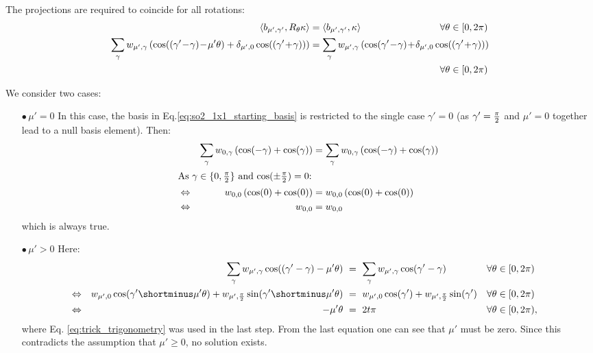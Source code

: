 \documentclass{article}
\newcommand{\lp}{\left(}
\newcommand{\rp}{\right)}
\begin{document}
The projections are required to coincide for all rotations:
\begin{align*}
	\langle b_{\mu',\gamma'},  R_{\theta} \kappa \rangle &= \langle b_{\mu',\gamma'},  \kappa \rangle  & \forall\theta\in[0,2\pi)\phantom{,}\!\\
\sum_{\gamma} w_{\mu', \gamma} \lp\cos((\gamma'\!-\!\gamma) \!-\! \mu'\theta) + \delta_{\mu', 0}\cos((\gamma'\!+\!\gamma)) \rp &=
	\sum_{\gamma} w_{\mu', \gamma} \lp\cos(\gamma'\!-\!\gamma) \!+\! \delta_{\mu', 0}\cos((\gamma'\!+\!\gamma)) \rp \span \\
	&&\forall\theta\in[0,2\pi)\phantom{,}\!
\end{align*}

We consider two cases:
\begin{itemize}
\item[$\bullet\,\mu'\!=\!0$]
In this case, the basis in Eq.\eqref{eq:so2_1x1_starting_basis} is restricted to the single case $\gamma' = 0$ (as $\gamma' = {\pi\over2}$ and $\mu' = 0$ together lead to a null basis element).
Then:
\begin{align*}
	&&\sum_{\gamma} w_{0, \gamma} \lp\cos(-\gamma) + \cos(\gamma) \rp &= \sum_{\gamma} w_{0, \gamma} \lp\cos(-\gamma) + \cos(\gamma) \rp \\
\intertext{As $\gamma \in \{0, {\pi\over 2}\}$ and $\cos(\pm {\pi\over 2}) = 0$:}
	&\Leftrightarrow &w_{0, 0} \lp\cos(0) + \cos(0) \rp &= w_{0, 0} \lp\cos(0) + \cos(0) \rp \\
	&\Leftrightarrow &w_{0,0} &= w_{0,0}
\end{align*}
which is always true.

\item[$\bullet\,\mu'\!>\!0$] Here:
\begin{align*}
	&&\sum_{\gamma} w_{\mu', \gamma} \cos((\gamma'-\gamma) - \mu'\theta)\ &=\ \sum_{\gamma} w_{\mu', \gamma} \cos(\gamma'-\gamma) &\forall\theta\in[0,2\pi) \\
	&\Leftrightarrow &w_{\mu', 0} \cos(\gamma' \shortminus \mu'\theta) + w_{\mu', {\pi\over2}} \sin(\gamma' \shortminus \mu'\theta)\ &=\ w_{\mu', 0} \cos(\gamma') + w_{\mu', {\pi\over2}} \sin(\gamma') &\forall\theta\in[0,2\pi) \\
&\Leftrightarrow &- \mu'\theta\ &=\ 2t\pi &\forall\theta\in[0,2\pi)&,
\end{align*}
where Eq. \eqref{eq:trick_trigonometry} was used in the last step.
From the last equation one can see that $\mu'$ must be zero.
Since this contradicts the assumption that $\mu'\geq0$, no solution exists.


\end{itemize}
\end{document}

